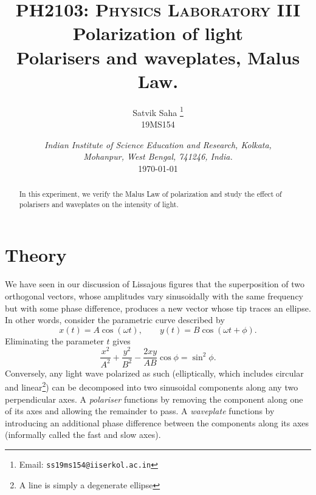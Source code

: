 \documentclass[11pt]{article}
\title{
        \Large\textsc{PH2103: Physics Laboratory III} \\
        \vspace{10pt}
        \Huge \textbf{Polarization of light} \\
        \vspace{5pt}
        \large{Polarisers and waveplates, Malus Law.}
}
\author{
        \large Satvik Saha%
        \thanks{Email: \tt ss19ms154@iiserkol.ac.in}
        \\\textsc{\small 19MS154}
}
\date{\normalsize
        \textit{Indian Institute of Science Education and Research, Kolkata, \\
        Mohanpur, West Bengal, 741246, India.} \\
        \vspace{10pt}
        \today
}
\begin{document}
        \maketitle

        \begin{abstract}
                In this experiment, we verify the Malus Law of polarization and study the effect of polarisers and waveplates on the intensity
                of light.
        \end{abstract}

        \section{Theory}
        We have seen in our discussion of Lissajous figures that the superposition of two orthogonal vectors, whose amplitudes vary sinusoidally
        with the same frequency but with some phase difference, produces a new vector whose tip traces an ellipse.
        In other words, consider the parametric curve described by
        \[
                x(t) = A\cos(\omega t), \qquad y(t) = B\cos(\omega t + \phi).
        \]
        Eliminating the parameter $t$ gives
        \[
                \frac{x^2}{A^2} + \frac{y^2}{B^2} - \frac{2xy}{AB}\cos\phi = \sin^2\phi.
        \]
        Conversely, any light wave polarized as such (elliptically, which includes circular and linear\footnote{A line is simply a degenerate ellipse})
        can be decomposed into two sinusoidal components along any two perpendicular axes.
        A \textit{polariser} functions by removing the component along one of its axes and allowing the remainder to pass.
        A \textit{waveplate} functions by introducing an additional phase difference between the components along its axes 
        (informally called the fast and slow axes).
        
\end{document}
